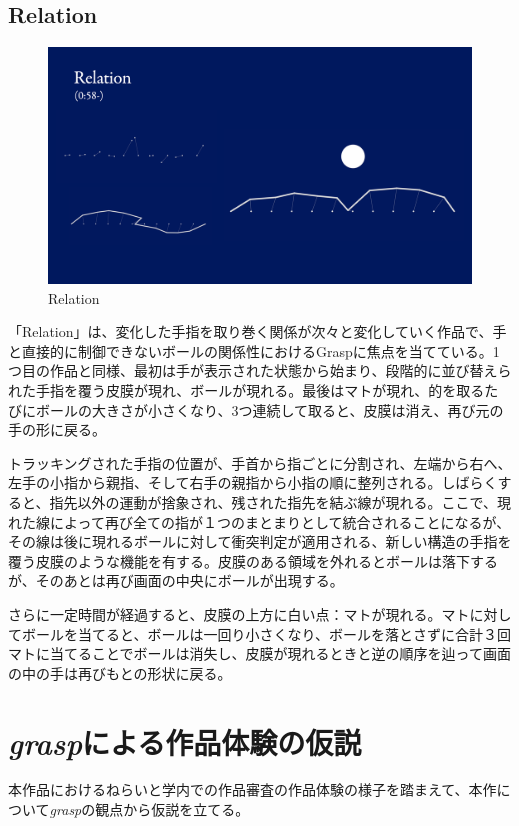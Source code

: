 \subsection*{Relation}
\begin{figure}[H]
  \centering
  \includegraphics[width=15cm]{img/relation.png}
  \caption{Relation}
  \label{fig:relation}
\end{figure}
「Relation」は、変化した手指を取り巻く関係が次々と変化していく作品で、手と直接的に制御できないボールの関係性におけるGraspに焦点を当てている。1つ目の作品と同様、最初は手が表示された状態から始まり、段階的に並び替えられた手指を覆う皮膜が現れ、ボールが現れる。最後はマトが現れ、的を取るたびにボールの大きさが小さくなり、3つ連続して取ると、皮膜は消え、再び元の手の形に戻る。

トラッキングされた手指の位置が、手首から指ごとに分割され、左端から右へ、左手の小指から親指、そして右手の親指から小指の順に整列される。しばらくすると、指先以外の運動が捨象され、残された指先を結ぶ線が現れる。ここで、現れた線によって再び全ての指が１つのまとまりとして統合されることになるが、その線は後に現れるボールに対して衝突判定が適用される、新しい構造の手指を覆う皮膜のような機能を有する。皮膜のある領域を外れるとボールは落下するが、そのあとは再び画面の中央にボールが出現する。

さらに一定時間が経過すると、皮膜の上方に白い点：マトが現れる。マトに対してボールを当てると、ボールは一回り小さくなり、ボールを落とさずに合計３回マトに当てることでボールは消失し、皮膜が現れるときと逆の順序を辿って画面の中の手は再びもとの形状に戻る。

\section{\textit{grasp}による作品体験の仮説}
\label{nerai}
本作品におけるねらいと学内での作品審査の作品体験の様子を踏まえて、本作について\textit{grasp}の観点から仮説を立てる。


